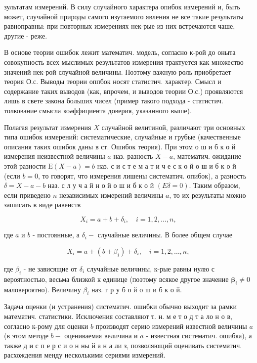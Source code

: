 \documentclass[10pt]{article}
\begin{document}
зультатам измерений. В силу случайного характера опибок измерений и, быть может, случайной природы самого изутаемого явления не все такие результаты равноправны: при повторных измерениях нек-рые из них встречаются чаше, другие - реже.

В основе теории ошибок лежит математич. модель, согласно к-рой до оныта совокупность всех мыслимых результатов измерения трактуется как множество значений нек-рой случайной величины. Поэтому важную роль приобретает теория О.с. Выводы теории оппбок носят статистич. характер. Смысл и содержание таких выводов (как, впрочем, и выводов теории О.с.) проявляются лишь в свете закона больших чисел (пример такого подхода - статистич. толкование смысла коәффициента доверия, указанного выше).

Полагая результат измерения $X$ случайной велитиной, различают три основных типа ошибок измерений: систематические, случайные и грубые (качественные описания таких ошибок даны в ст. Ошибок теория). При этом о ш и б к о й измерения неизвестной величины $a$ наз. разность $X-a$, математич. ожидание этой разности $\mathrm{E}(X-a)=b$ наз. с и с т е м а т и ч е с к о й о ш и б к о й (если $b=0$, то говорят, что измерения лишены систематич. опибок), а разность $\delta=X-a-b$ наз. с л у ч а й н о й о ш и б к о й $(E \delta=0)$. Таким образом, если приведено $n$ независимых измерений величины $a$, то их результаты можно зашисать в виде равенств

\[
X_{i}=a+b+\delta_{i}, \quad i=1,2, \ldots, n,
\]

где $a$ и $b$ - постоянные, а $\delta_{i}-$ случайные величины. В более общем случае

\[
X_{i}=a+\left(b+\beta_{i}\right)+\delta_{i}, \quad i=1,2, \ldots, n,
\]

где $\beta_{i}$ - не зависящие от $\delta_{i}$ случайные величины, к-рые равны нулю с вероятностью, весьма близкой к единице (поэтому всякое другое значение $\boldsymbol{\beta}_{i} \neq 0$ маловероятно). Величину $\beta_{i}$ наз. г р у б о й о ш и б к о й.

Задача оценки (и устранения) систематич. ошибки обычно выходит за рамки математич. статистики. Исключения составляют т. н. м е т о д т а ло н о в, согласно к-рому для оценки $b$ производят серию измерений известной величины $a$ (в этом методе $b-$ оцениваемая величина и $a$ - известная систематич. ошибка), а также д и с п е р с и о н ны й а н а ли з, позволяющий оценивать систематич. расхождения менду несколькими сериями измерений.
\end{document}

